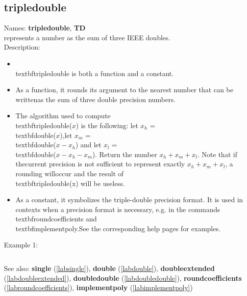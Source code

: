 \subsection{tripledouble}
\label{labtripledouble}
\noindent Names: \textbf{tripledouble}, \textbf{TD}\\
represents a number as the sum of three IEEE doubles.\\
\noindent Description: \begin{itemize}

\item \\textbf{tripledouble} is both a function and a constant.\n
\item As a function, it rounds its argument to the nearest number that can be written\n   as the sum of three double precision numbers.\n
\item The algorithm used to compute \\textbf{tripledouble}($x$) is the following: let $x_h$ = \\textbf{double}($x$),\n   let $x_m$ = \\textbf{double}($x-x_h$) and let $x_l$ = \\textbf{double}($x-x_h-x_m$). \n   Return the number $x_h+x_m+x_l$. Note that if the\n   current precision is not sufficient to represent exactly $x_h+x_m+x_l$, a rounding will\n   occur and the result of \\textbf{tripledouble}(x) will be useless.\n
\item As a constant, it symbolizes the triple-double precision format. It is used in \n   contexts when a precision format is necessary, e.g. in the commands \n   \\textbf{roundcoefficients} and \\textbf{implementpoly}.\n   See the corresponding help pages for examples.\n\end{itemize}
\noindent Example 1: 
\begin{center}\begin{minipage}{15cm}\begin{Verbatim}[frame=single]
\end{Verbatim}
\end{minipage}\end{center}
See also: \textbf{single} (\ref{labsingle}), \textbf{double} (\ref{labdouble}), \textbf{doubleextended} (\ref{labdoubleextended}), \textbf{doubledouble} (\ref{labdoubledouble}), \textbf{roundcoefficients} (\ref{labroundcoefficients}), \textbf{implementpoly} (\ref{labimplementpoly})
